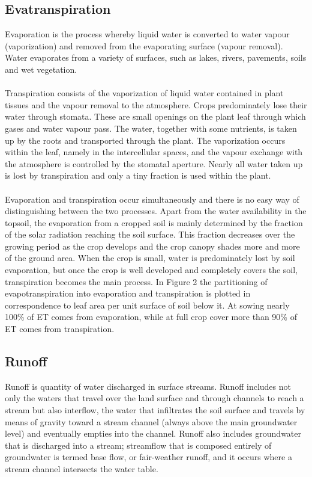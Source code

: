 \subsection{Evatranspiration}
Evaporation is the process whereby liquid water is converted to water vapour (vaporization) and removed from the evaporating surface (vapour removal). Water evaporates from a variety of surfaces, such as lakes, rivers, pavements, soils and wet vegetation.\\\\
Transpiration consists of the vaporization of liquid water contained in plant tissues and the vapour removal to the atmosphere. Crops predominately lose their water through stomata. These are small openings on the plant leaf through which gases and water vapour pass. The water, together with some nutrients, is taken up by the roots and transported through the plant. The vaporization occurs within the leaf, namely in the intercellular spaces, and the vapour exchange with the atmosphere is controlled by the stomatal aperture. Nearly all water taken up is lost by transpiration and only a tiny fraction is used within the plant.\\\\
Evaporation and transpiration occur simultaneously and there is no easy way of distinguishing between the two processes. Apart from the water availability in the topsoil, the evaporation from a cropped soil is mainly determined by the fraction of the solar radiation reaching the soil surface. This fraction decreases over the growing period as the crop develops and the crop canopy shades more and more of the ground area. When the crop is small, water is predominately lost by soil evaporation, but once the crop is well developed and completely covers the soil, transpiration becomes the main process. In Figure 2 the partitioning of evapotranspiration into evaporation and transpiration is plotted in correspondence to leaf area per unit surface of soil below it. At sowing nearly 100\% of ET comes from evaporation, while at full crop cover more than 90\% of ET comes from transpiration.\cite{allen1998crop}
\subsection{Runoff}
Runoff is quantity of water discharged in surface streams. Runoff includes not only the waters that travel over the land surface and through channels to reach a stream but also interflow, the water that infiltrates the soil surface and travels by means of gravity toward a stream channel (always above the main groundwater level) and eventually empties into the channel. Runoff also includes groundwater that is discharged into a stream; streamflow that is composed entirely of groundwater is termed base flow, or fair-weather runoff, and it occurs where a stream channel intersects the water table.
